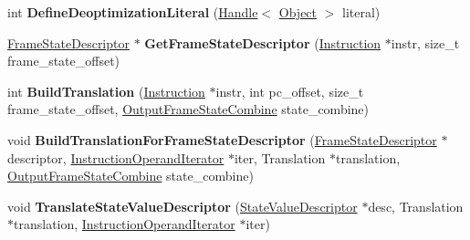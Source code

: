 \begin{DoxyCompactItemize}
\item 
int {\bfseries Define\+Deoptimization\+Literal} (\hyperlink{classv8_1_1internal_1_1_handle}{Handle}$<$ \hyperlink{classv8_1_1internal_1_1_object}{Object} $>$ literal)\hypertarget{classv8_1_1internal_1_1compiler_1_1_code_generator_ac4845da9620bf37782ddb19d92533a8f}{}\label{classv8_1_1internal_1_1compiler_1_1_code_generator_ac4845da9620bf37782ddb19d92533a8f}

\item 
\hyperlink{classv8_1_1internal_1_1compiler_1_1_frame_state_descriptor}{Frame\+State\+Descriptor} $\ast$ {\bfseries Get\+Frame\+State\+Descriptor} (\hyperlink{classv8_1_1internal_1_1compiler_1_1_instruction}{Instruction} $\ast$instr, size\+\_\+t frame\+\_\+state\+\_\+offset)\hypertarget{classv8_1_1internal_1_1compiler_1_1_code_generator_aca4715126e7025d43cae8fdffd5fdf04}{}\label{classv8_1_1internal_1_1compiler_1_1_code_generator_aca4715126e7025d43cae8fdffd5fdf04}

\item 
int {\bfseries Build\+Translation} (\hyperlink{classv8_1_1internal_1_1compiler_1_1_instruction}{Instruction} $\ast$instr, int pc\+\_\+offset, size\+\_\+t frame\+\_\+state\+\_\+offset, \hyperlink{classv8_1_1internal_1_1compiler_1_1_output_frame_state_combine}{Output\+Frame\+State\+Combine} state\+\_\+combine)\hypertarget{classv8_1_1internal_1_1compiler_1_1_code_generator_aa471eee2e8137887651655488401ed27}{}\label{classv8_1_1internal_1_1compiler_1_1_code_generator_aa471eee2e8137887651655488401ed27}

\item 
void {\bfseries Build\+Translation\+For\+Frame\+State\+Descriptor} (\hyperlink{classv8_1_1internal_1_1compiler_1_1_frame_state_descriptor}{Frame\+State\+Descriptor} $\ast$descriptor, \hyperlink{classv8_1_1internal_1_1compiler_1_1_instruction_operand_iterator}{Instruction\+Operand\+Iterator} $\ast$iter, Translation $\ast$translation, \hyperlink{classv8_1_1internal_1_1compiler_1_1_output_frame_state_combine}{Output\+Frame\+State\+Combine} state\+\_\+combine)\hypertarget{classv8_1_1internal_1_1compiler_1_1_code_generator_ab83dc79908720062e371818a6d75a920}{}\label{classv8_1_1internal_1_1compiler_1_1_code_generator_ab83dc79908720062e371818a6d75a920}

\item 
void {\bfseries Translate\+State\+Value\+Descriptor} (\hyperlink{classv8_1_1internal_1_1compiler_1_1_state_value_descriptor}{State\+Value\+Descriptor} $\ast$desc, Translation $\ast$translation, \hyperlink{classv8_1_1internal_1_1compiler_1_1_instruction_operand_iterator}{Instruction\+Operand\+Iterator} $\ast$iter)\hypertarget{classv8_1_1internal_1_1compiler_1_1_code_generator_a1f0b77c41f8b6c8f865e21dc386736b1}{}\label{classv8_1_1internal_1_1compiler_1_1_code_generator_a1f0b77c41f8b6c8f865e21dc386736b1}


\end{DoxyCompactItemize}
